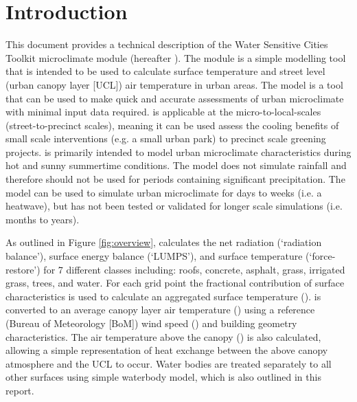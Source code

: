 \documentclass[final,3p,times,authoryear]{elsarticle}
\begin{document}







\section{Introduction}\label{sec:introduction}



This document provides a technical description of the Water Sensitive Cities Toolkit microclimate module (hereafter ). The module is a simple modelling tool that is intended to be used to calculate surface temperature and street level (urban canopy layer [UCL]) air temperature in urban areas. The model is a tool that can be used to make quick and accurate assessments of urban microclimate with minimal input data required.  is applicable at the micro-to-local-scales (street-to-precinct scales), meaning it can be used assess the cooling benefits of small scale interventions (e.g. a small urban park) to precinct scale greening projects.  is primarily intended to model urban microclimate characteristics during hot and sunny summertime conditions. The model does not simulate rainfall and therefore should not be used for periods containing significant precipitation. The model can be used to simulate urban microclimate for days to weeks (i.e. a heatwave), but has not been tested or validated for longer scale simulations (i.e. months to years). 

As outlined in Figure \ref{fig:overview},  calculates the net radiation (`radiation balance'), surface energy balance (`LUMPS'), and surface temperature (`force-restore') for 7 different classes including: roofs, concrete, asphalt, grass, irrigated grass, trees, and water.  For each grid point the fractional contribution of surface characteristics is used to calculate an aggregated surface temperature ().  is converted to an average canopy layer air temperature () using a reference (Bureau of Meteorology [BoM]) wind speed () and building geometry characteristics. The air temperature above the canopy () is also calculated, allowing a simple representation of heat exchange between the above canopy atmosphere and the UCL to occur. Water bodies are treated separately to all other surfaces using simple waterbody model, which is also outlined in this report. 
\end{document}
